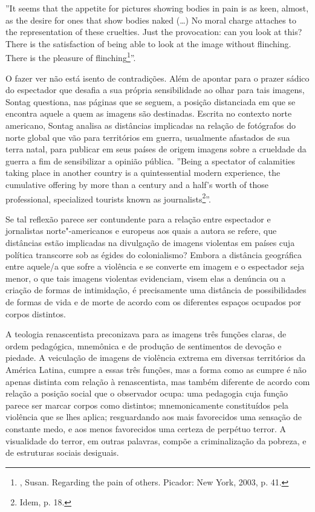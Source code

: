 ''It seems that the appetite for pictures showing bodies in pain is as
keen, almost, as the desire for ones that show bodies naked (\ldots{}) No
moral charge attaches to the representation of these cruelties. Just the
provocation: can you look at this? There is the satisfaction of being
able to look at the image without flinching. There is the pleasure of
flinching\footnote{, Susan. Regarding the pain of others. Picador:
  New York, 2003, p. 41.}''.

O fazer ver não está isento de contradições. Além de apontar para o
prazer sádico do espectador que desafia a sua própria sensibilidade ao
olhar para tais imagens, Sontag questiona, nas páginas que se seguem, a
posição distanciada em que se encontra aquele a quem as imagens são
destinadas. Escrita no contexto norte americano, Sontag analisa as
distâncias implicadas na relação de fotógrafos do norte global que vão
para territórios em guerra, usualmente afastados de sua terra natal,
para publicar em seus países de origem imagens sobre a crueldade da
guerra a fim de sensibilizar a opinião pública. ''Being a spectator of
calamities taking place in another country is a quintessential modern
experience, the cumulative offering by more than a century and a half's
worth of those professional, specialized tourists known as
journalists\footnote{Idem, p. 18.}''.

Se tal reflexão parece ser contundente para a relação entre espectador e
jornalistas norte"-americanos e europeus aos quais a autora se refere,
que distâncias estão implicadas na divulgação de imagens violentas em
países cuja política transcorre sob as égides do colonialismo? Embora a
distância geográfica entre aquele/a que sofre a violência e se converte
em imagem e o espectador seja menor, o que tais imagens violentas
evidenciam, visem elas a denúncia ou a criação de formas de intimidação,
é precisamente uma distância de possibilidades de formas de vida e de
morte de acordo com os diferentes espaços ocupados por corpos distintos.

A teologia renascentista preconizava para as imagens três funções
claras, de ordem pedagógica, mnemônica e de produção de sentimentos de
devoção e piedade. A veiculação de imagens de violência extrema em
diversas territórios da América Latina, cumpre a essas três funções, mas
a forma como as cumpre é não apenas distinta com relação à
renascentista, mas também diferente de acordo com relação a posição
social que o observador ocupa: uma pedagogia cuja função parece ser
marcar corpos como distintos; mnemonicamente constituídos pela violência
que se lhes aplica; resguardando aos mais favorecidos uma sensação de
constante medo, e aos menos favorecidos uma certeza de perpétuo terror.
A visualidade do terror, em outras palavras, compõe a criminalização da
pobreza, e de estruturas sociais desiguais.

